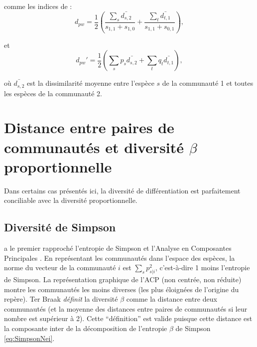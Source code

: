 \documentclass[
  11pt,
  french,
  a4paper,
  extrafontsizes,onecolumn,openright
  ]{memoir}
\begin{document}
comme les indices de \textcite{Swenson2011}:
\begin{equation}
  \label{eq:Swenson2011a}
  d_{\mathit{pw}} = \frac{1}{2}\left( \frac{\sum_s{\bar{d_{s,2}}}}{s_{1,1}+s_{1,0}} + \frac{\sum_t{\bar{d_{t,1}}}}{s_{1,1}+s_{0,1}} \right),
\end{equation}

et
\begin{equation}
  \label{eq:Swenson2011b}
  d_{\mathit{pw}}' = \frac{1}{2}\left( \sum_s{p_s\bar{d_{s,2}}} + \sum_t{q_t\bar{d_{t,1}}} \right), 
\end{equation}

où \(\bar{d_{s,2}}\) est la dissimilarité moyenne entre l'espèce \(s\) de la communauté 1 et toutes les espèces de la communauté 2.

\hypertarget{distance-entre-paires-de-communautuxe9s-et-diversituxe9-beta-proportionnelle}{%
\section{\texorpdfstring{Distance entre paires de communautés et diversité \(\beta\) proportionnelle}{Distance entre paires de communautés et diversité \textbackslash beta proportionnelle}}\label{distance-entre-paires-de-communautuxe9s-et-diversituxe9-beta-proportionnelle}}

Dans certains cas présentés ici, la diversité de différentiation est parfaitement conciliable avec la diversité proportionnelle.

\hypertarget{diversituxe9-de-simpson}{%
\subsection{Diversité de Simpson}\label{diversituxe9-de-simpson}}

\textcite{terBraak1983} a le premier rapproché l'entropie de Simpson et l'Analyse en Composantes Principales \autocite{Pearson1901}.
En représentant les communautés dans l'espace des espèces, la norme du vecteur de la communauté \(i\) est \({\sum_s{p_{s|i}^2}}\), c'est-à-dire 1 moins l'entropie de Simpson.
La représentation graphique de l'ACP (non centrée, non réduite) montre les communautés les moins diverses (les plus éloignées de l'origine du repère).
Ter Braak \emph{définit} la diversité \(\beta\) comme la distance entre deux communautés (et la moyenne des distances entre paires de communautés si leur nombre est supérieur à 2).
Cette ``définition'' est valide puisque cette distance est la composante inter de la décomposition de l'entropie \(\beta\) de Simpson \eqref{eq:SimpsonNei}.
\end{document}
